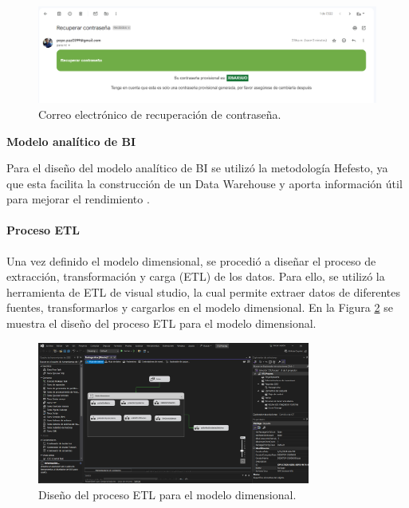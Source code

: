 \begin{figure}[H]
    \centering
    \includegraphics[width=1\textwidth]{chapters/III-resultados-y-discusion/resources/images/recuperar-contrasena-email.png}
    \caption{Correo electrónico de recuperación de contraseña.}
    \label{fig:recuperar-contrasena-email}
\end{figure}

\textbf{Modelo analítico de BI}
\bigbreak

Para el diseño del modelo analítico de BI se utilizó la metodología Hefesto, ya que esta facilita la construcción de un
Data Warehouse y aporta información útil para mejorar el rendimiento \cite{darioDATAWAREHOUSINGMarco2018}.



\paragraph{Proceso ETL}

Una vez definido el modelo dimensional, se procedió a diseñar el proceso de extracción, transformación y carga (ETL) de los datos.
Para ello, se utilizó la herramienta de ETL de visual studio, la cual permite extraer datos de diferentes fuentes, transformarlos
y cargarlos en el modelo dimensional. En la Figura \ref{fig:etl-bi} se muestra el diseño del proceso ETL para el modelo dimensional.

\begin{figure}[H]
    \centering
    \includegraphics[width=0.8\textwidth]{chapters/III-resultados-y-discusion/resources/images/etl-bi.png}
    \caption{Diseño del proceso ETL para el modelo dimensional.}
    \label{fig:etl-bi}
\end{figure}

